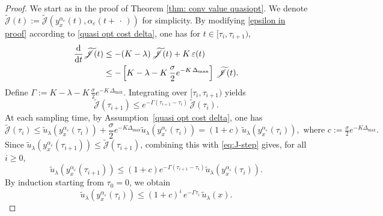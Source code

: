 \documentclass[12pt]{amsart}
\newcommand{\D}[1]{\mbox{\rm #1}}
\newcommand{\dd}{\D{d}}
\numberwithin{equation}{section}
\theoremstyle{plain}
\begin{document}
\begin{proof}
We start as in the proof of Theorem \ref{thm: conv value quasiopt}. We denote $\widetilde{\mathscr{J}}(t):=\widetilde{\mathscr{J}}(y_{x}^{\alpha_{\varepsilon}}(t),\alpha_{\varepsilon}(t+\,\cdot\,))$ for simplicity. By modifying \eqref{epsilon in proof} according to \ref{quasi opt cost delta}, one has for $t \in[\tau_i, \tau_{i+1})$,
\begin{equation}\label{ineq diff in proof}
\begin{aligned}
    \frac{\dd }{\dd t} \widetilde{\mathscr{J}}(t)
    & \leq -(K-\lambda) \,\widetilde{\mathscr{J}}(t) + K\,\varepsilon(t)\\
    & \leq -\left[K-\lambda - K \, \frac{\sigma}{2}e^{-K\,\Delta_{\max}}\right] \,\widetilde{\mathscr{J}}(t).
\end{aligned}
\end{equation}
Define $\Gamma:= K-\lambda - K \, \frac{\sigma}{2}e^{-K\,\Delta_{\max}}.$ 
Integrating over $[\tau_i,\tau_{i+1})$ yields
\begin{equation}\label{eq:J-step}
\widetilde{\mathscr{J}}(\tau_{i+1})
   \le e^{-\Gamma(\tau_{i+1}-\tau_i)}\,\widetilde{\mathscr{J}}(\tau_{i}).
\end{equation}
At each sampling time, by Assumption~\ref{quasi opt cost delta}, one has
\begin{equation*}
\widetilde{\mathscr{J}}(\tau_{i})
      \le \tilde u_\lambda(y_{x}^{\alpha_{\varepsilon}}(\tau_i))
         + \frac{\sigma}{2}e^{-K\Delta_{\max}}\tilde u_\lambda(y_{x}^{\alpha_{\varepsilon}}(\tau_i))
      = (1+c)\,\tilde u_\lambda(y_{x}^{\alpha_{\varepsilon}}(\tau_i)),
      \text{ where } c:=\tfrac{\sigma}{2}e^{-K\Delta_{\max}}.
\end{equation*}
Since $\tilde u_\lambda(y_{x}^{\alpha_{\varepsilon}}(\tau_{i+1}))\le\widetilde{\mathscr{J}}(\tau_{i+1})$,
combining this with \eqref{eq:J-step} gives, for all $i\ge0$,
\begin{equation*}
\tilde u_\lambda(y_{x}^{\alpha_{\varepsilon}}(\tau_{i+1}))
   \le (1+c)e^{-\Gamma(\tau_{i+1}-\tau_i)}\tilde u_\lambda(y_{x}^{\alpha_{\varepsilon}}(\tau_i)).
\end{equation*}
By induction starting from $\tau_0=0$, we obtain
\begin{equation}\label{eq:disc-bound}
\tilde u_\lambda(y_{x}^{\alpha_{\varepsilon}}(\tau_i))
   \le (1+c)^i\,e^{-\Gamma\tau_i}\,\tilde u_\lambda(x).
\end{equation}


\end{proof}
\end{document}
